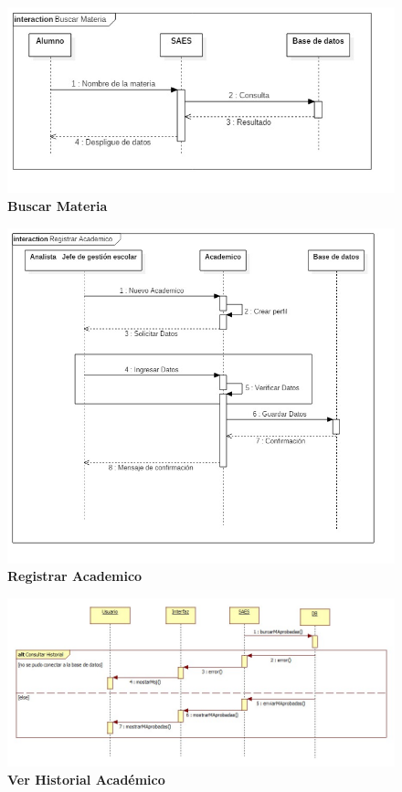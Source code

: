\begin{figure}[H]
  \centering
    \includegraphics[scale=0.5,angle=90]{project/Secuencia/Buscar_Materia.jpg}
  \caption{\textbf{Buscar Materia}}
\end{figure}
\begin{figure}[H]
  \centering
    \includegraphics[scale=0.5,angle=90]{project/Secuencia/Registrar_Academico.jpg}
  \caption{\textbf{Registrar Academico}}
\end{figure}
\begin{figure}[H]
  \centering
    \includegraphics[scale=0.5,angle=0]{project/Secuencia/Ver_Historial.jpg}
  \caption{\textbf{Ver Historial Académico}}
\end{figure}
